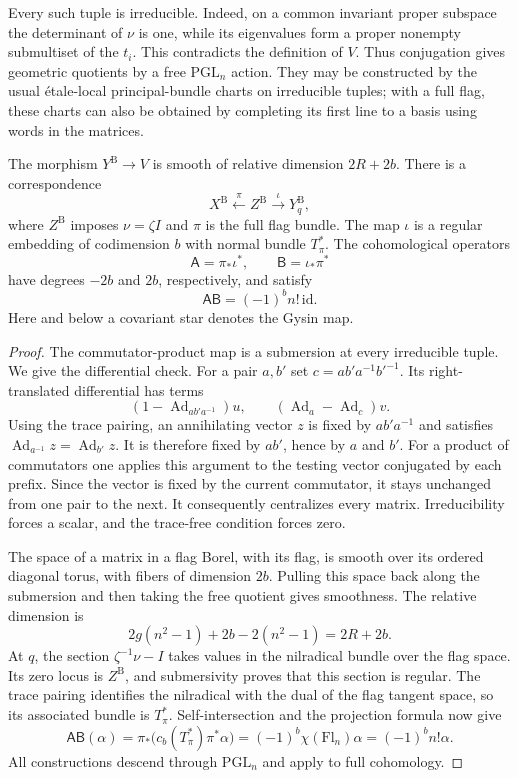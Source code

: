 Every such tuple is irreducible.  Indeed, on a common invariant proper
subspace the determinant of $\nu$ is one, while its eigenvalues form a
proper nonempty submultiset of the $t_i$.  This contradicts the definition
of $V$.  Thus conjugation gives geometric quotients by a free
$\mathrm{PGL}_n$ action.  They may be constructed by the usual
\'etale-local principal-bundle charts on irreducible tuples; with a full
flag, these charts can also be obtained by completing its first line to
a basis using words in the matrices.

\begin{lemma}\label{betti:geometry}
The morphism $Y^{\mathrm B}\to V$ is smooth of relative dimension
$2R+2b$.  There is a correspondence
\[
 X^{\mathrm B}\xleftarrow{\ \pi\ }Z^{\mathrm B}
 \xrightarrow{\ \iota\ }Y^{\mathrm B}_q,
\]
where $Z^{\mathrm B}$ imposes $\nu=\zeta I$ and $\pi$ is the full flag
bundle.  The map $\iota$ is a regular embedding of codimension $b$ with
normal bundle $T_\pi^*$.  The cohomological operators
\[
 \mathsf A=\pi_*\iota^*,\qquad
 \mathsf B=\iota_*\pi^*
\]
have degrees $-2b$ and $2b$, respectively, and satisfy
\begin{equation}\label{betti:split}
 \mathsf A\mathsf B=(-1)^b n!\,\mathrm{id}.
\end{equation}
Here and below a covariant star denotes the Gysin map.
\end{lemma}

\begin{proof}
The commutator-product map is a submersion at every irreducible tuple.
We give the differential check.  For a pair $a,b'$ set
$c=ab'a^{-1}b'^{-1}$.  Its right-translated differential has terms
\[
 (1-\operatorname{Ad}_{ab'a^{-1}})u,\qquad
 (\operatorname{Ad}_a-\operatorname{Ad}_c)v.
\]
Using the trace pairing, an annihilating vector $z$ is fixed by
$ab'a^{-1}$ and satisfies
$\operatorname{Ad}_{a^{-1}}z=\operatorname{Ad}_{b'}z$.
It is therefore fixed by $ab'$, hence by $a$ and $b'$.
For a product of commutators one applies this argument to the testing
vector conjugated by each prefix.  Since the vector is fixed by the
current commutator, it stays unchanged from one pair to the next.
It consequently centralizes every matrix.  Irreducibility forces a
scalar, and the trace-free condition forces zero.

The space of a matrix in a flag Borel, with its flag, is smooth over
its ordered diagonal torus, with fibers of dimension $2b$.
Pulling this space back along the submersion and then taking the free
quotient gives smoothness.  The relative dimension is
\[
 2g(n^2-1)+2b-2(n^2-1)=2R+2b.
\]
At $q$, the section $\zeta^{-1}\nu-I$ takes values in the nilradical
bundle over the flag space.  Its zero locus is $Z^{\mathrm B}$, and
submersivity proves that this section is regular.  The trace pairing
identifies the nilradical with the dual of the flag tangent space, so
its associated bundle is $T_\pi^*$.  Self-intersection and the projection
formula now give
\[
 \mathsf A\mathsf B(\alpha)
 =\pi_*\bigl(c_b(T_\pi^*)\pi^*\alpha\bigr)
 =(-1)^b\chi(\mathrm{Fl}_n)\alpha
 =(-1)^b n!\alpha.
\]
All constructions descend through $\mathrm{PGL}_n$ and apply to full
cohomology.
\end{proof}

